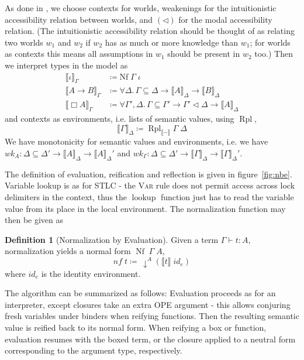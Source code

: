 \documentclass[12pt,twoside,openright]{report}
\numberwithin{equation}{chapter}
\numberwithin{figure}{chapter}
\numberwithin{table}{chapter}
\theoremstyle{definition}\newtheorem{definition}{Definition}
\begin{document}
As done in \cite{valliappan22}, we choose contexts for worlds,
weakenings for the intuitionistic accessibility relation between worlds, and
$(\lhd)$ for the modal accessibility relation.
(The intuitionistic accessibility relation should be thought of as
relating two worlds $w_1$ and $w_2$ if $w_2$ has as much or more knowledge than $w_1$;
for worlds as contexts this means all assumptions in $w_1$ should be present in $w_2$ too.)
Then we interpret types in the model as
\begin{equation}\label{eq:sem-values}
  \begin{split}
  \llbracket \iota \rrbracket_\Gamma &\coloneqq \text{Nf} \; \Gamma \; \iota \\
  \llbracket A \to B \rrbracket_\Gamma &\coloneqq \forall \Delta. \, \Gamma \subseteq \Delta \to \llbracket A \rrbracket_\Delta \to \llbracket B \rrbracket_\Delta \\
  \llbracket \Box A \rrbracket_\Gamma &\coloneqq \forall \Gamma', \Delta. \, \Gamma \subseteq \Gamma' \to \Gamma'\lhd\Delta \to \llbracket A \rrbracket_\Delta
  \end{split}
\end{equation}
and contexts as environments, i.e. lists of semantic values, using $\operatorname{Rpl}$,
$$ \llbracket \Gamma \rrbracket_\Delta \coloneqq \operatorname{Rpl}_{\llbracket-\rrbracket} \Gamma \; \Delta $$
We have monotonicity for semantic values and environments,
i.e. we have
$wk_A : \Delta \subseteq \Delta' \to \llbracket A \rrbracket_\Delta \to \llbracket A \rrbracket_\Delta'$ and
$wk_\Gamma : \Delta \subseteq \Delta' \to \llbracket \Gamma \rrbracket_\Delta \to \llbracket \Gamma \rrbracket_\Delta'$.

The definition of evaluation, reification and reflection is given in figure~\ref{fig:nbe}.
Variable lookup is as for STLC -
the \textsc{Var} rule does not permit access across lock delimiters in the context,
thus the $\operatorname{lookup}$ function just has to read
the variable value from its place in the local environment.
The normalization function may then be given as
\begin{definition}[Normalization by Evaluation]
  Given a term $\Gamma \vdash t : A$,
  normalization yields a normal form $\operatorname{Nf} \; \Gamma \; A$,
  $$ \textit{nf} \; t \coloneqq \, \downarrow^A (\llbracket t \rrbracket \; \textit{id}_e) $$
  where $\textit{id}_e$ is the identity environment.
\end{definition}
The algorithm can be summarized as follows:
Evaluation proceeds as for an interpreter,
except closures take an extra OPE argument -
this allows conjuring fresh variables under binders
when reifying functions.
Then the resulting semantic value is reified back to its normal form.
When reifying a box or function,
evaluation resumes with the boxed term,
or the closure applied to a neutral form corresponding to the argument type,
respectively.
\end{document}
